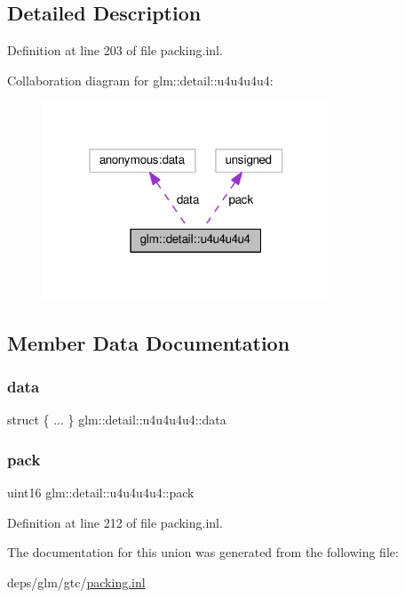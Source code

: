 \subsection{Detailed Description}


Definition at line 203 of file packing.\+inl.



Collaboration diagram for glm\+:\+:detail\+:\+:u4u4u4u4\+:
\nopagebreak
\begin{figure}[H]
\begin{center}
\leavevmode
\includegraphics[width=243pt]{d8/d46/unionglm_1_1detail_1_1u4u4u4u4__coll__graph}
\end{center}
\end{figure}


\subsection{Member Data Documentation}
\mbox{\label{unionglm_1_1detail_1_1u4u4u4u4_a138b91238bde678b330a15f1a02dc4a8}} 
\subsubsection{\texorpdfstring{data}{data}}
{\footnotesize\ttfamily struct \{ ... \}   glm\+::detail\+::u4u4u4u4\+::data}

\mbox{\label{unionglm_1_1detail_1_1u4u4u4u4_aa989a8fab51b41be68d0d07147fba3b8}} 
\subsubsection{\texorpdfstring{pack}{pack}}
{\footnotesize\ttfamily uint16 glm\+::detail\+::u4u4u4u4\+::pack}



Definition at line 212 of file packing.\+inl.



The documentation for this union was generated from the following file\+:\begin{DoxyCompactItemize}
\item 
deps/glm/gtc/\hyperlink{packing_8inl}{packing.\+inl}\end{DoxyCompactItemize}
